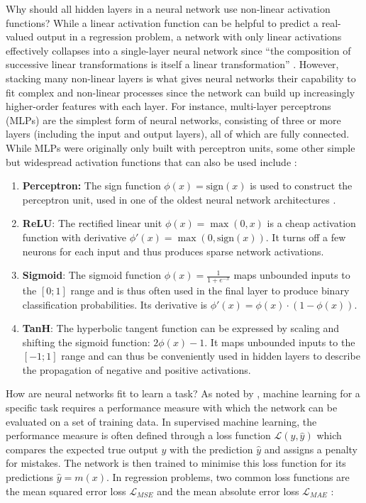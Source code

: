 \noindent Why should all hidden layers in a neural network use non-linear activation functions? While a linear activation function can be helpful to predict a real-valued output in a regression problem, a network with only linear activations effectively collapses into a single-layer neural network since ``the composition of successive linear transformations is itself a linear transformation'' \cite[p.~229]{ml-pattern-2006}. However, stacking many non-linear layers is what gives neural networks their capability to fit complex and non-linear processes since the network can build up increasingly higher-order features with each layer. For instance, multi-layer perceptrons (MLPs) are the simplest form of neural networks, consisting of three or more layers (including the input and output layers), all of which are fully connected. While MLPs were originally only built with perceptron units, some other simple but widespread activation functions that can also be used include \cite{activation-functions-2020, machine-learning-1997}:
\begin{enumerate}
    \item \textbf{Perceptron:} The sign function $\phi(x) = \text{sign}(x)$ is used to construct the perceptron unit, used in one of the oldest neural network architectures \cite{perceptron-1943}.
    \item \textbf{ReLU}: The rectified linear unit $\phi(x) = \max(0, x)$ is a cheap activation function with derivative $\phi'(x) = \max(0, \text{sign}(x))$. It turns off a few neurons for each input and thus produces sparse network activations.
    \item \textbf{Sigmoid}: The sigmoid function $\phi(x) = \frac{1}{1 + e^{-x}}$ maps unbounded inputs to the $[0; 1]$ range and is thus often used in the final layer to produce binary classification probabilities. Its derivative is $\phi'(x) = \phi(x) \cdot (1 - \phi(x))$.
    \item \textbf{TanH}: The hyperbolic tangent function can be expressed by scaling and shifting the sigmoid function: $2 \phi(x) - 1$. It maps unbounded inputs to the $[-1; 1]$ range and can thus be conveniently used in hidden layers to describe the propagation of negative and positive activations.
\end{enumerate}
\noindent How are neural networks fit to learn a task? As noted by \textcite{machine-learning-1997}, machine learning for a specific task requires a performance measure with which the network can be evaluated on a set of training data. In supervised machine learning, the performance measure is often defined through a loss function $\mathcal{L}(y, \hat{y})$ which compares the expected true output $y$ with the prediction $\hat{y}$ and assigns a penalty for mistakes. The network is then trained to minimise this loss function for its predictions $\hat{y} = m(x)$. In regression problems, two common loss functions are the mean squared error loss $\mathcal{L}_{MSE}$ and the mean absolute error loss $\mathcal{L}_{MAE}$ \cite{ml-pattern-2006, mae-rmse-2005}:
